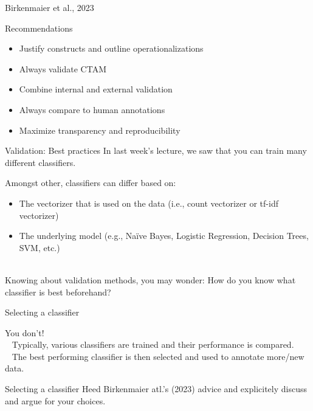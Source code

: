 \documentclass[compress]{beamer}
\begin{document}

\begin{frame}{Birkenmaier et al., 2023}
	\begin{alertblock}{Recommendations}
		\begin{itemize}
			\item Justify constructs and outline operationalizations
			\item Always validate CTAM
			\item Combine internal and external validation
			\item Always compare to human annotations
			\item Maximize transparency and reproducibility 
		\end{itemize}
	\end{alertblock}
\end{frame}


\begin{frame}{Validation: Best practices}
In last week's lecture, we saw that you can train many different classifiers.  

\begin{alertblock}{Amongst other, classifiers can differ based on:}
	\begin{itemize}
		\item The vectorizer that is used on the data (i.e., count vectorizer or tf-idf vectorizer)
		\item The underlying model (e.g., Naïve Bayes, Logistic Regression, Decision Trees, SVM, etc.)\\\
	\end{itemize}
\end{alertblock}
\pause
Knowing about validation methods, you may wonder:
How do you know what classifier is best beforehand?
\end{frame}


\begin{frame}{Selecting a classifier}

You don't!\\\
\pause
Typically, various classifiers are trained and their performance is compared.\\\
\pause
The best performing classifier is then selected and used to annotate more/new data.
\end{frame}


\begin{frame}{Selecting a classifier}
Heed Birkenmaier atl.'s (2023) advice and explicitely discuss and argue for your choices.
\end{frame}
\end{document}
